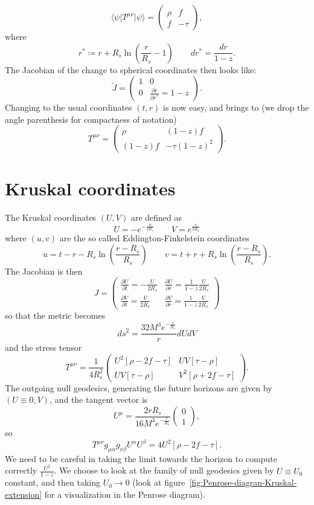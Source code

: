 \[
    \langle\psi\vert T^{\mu\nu}\vert\psi\rangle = 
    \begin{pmatrix}
        \rho & f \\
        f & -\tau
    \end{pmatrix} ,
\]
where
\[
    r^* \coloneqq r + R_s\ln\left(\frac{r}{R_s} - 1\right)    \quad \quad dr^* = \frac{dr}{1 - z}.
\]
The Jacobian of the change to spherical coordinates then looks like:
\[
\tilde{J} = \begin{pmatrix}
    1 & 0 \\
    0 & \frac{\partial r}{\partial r^*} = 1 - z
\end{pmatrix}.   
\]
Changing to the usual coordinates \((t, r)\) is now easy, and brings to (we drop the angle parenthesis for compactness of notation)
\[
   T^{\mu\nu} = \begin{pmatrix}
    \rho & (1 - z)f \\
    (1 - z)f  & -\tau(1 - z)^2
   \end{pmatrix}.
\]

\section{Kruskal coordinates}
The Kruskal coordinates \((U, V)\) are defined as 
\[
   U = - e^{-\frac{u}{2R_s}} \quad \quad V = e^{\frac{v}{2R_s}}
\]
where \((u,v)\) are the so called Eddington-Finkelstein coordinates
\[
u = t - r - R_s\ln\left(\frac{r - R_s}{R_s}\right)    \quad \quad 
v = t + r + R_s\ln\left(\frac{r - R_s}{R_s}\right).
\]
The Jacobian is then
\[
J = \begin{pmatrix}
    \frac{\partial U}{\partial t} = - \frac{U}{2R_s} & \frac{\partial U}{\partial r} = \frac{1}{1 - z} \frac{U}{2R_s} \\
    \frac{\partial V}{\partial t} = \frac{V}{2R_s} & \frac{\partial V}{\partial r} = \frac{1}{1 - z} \frac{V}{2R_s}
\end{pmatrix}    
\]
so that the metric becomes
\[
    ds^2 = \frac{32M^3e^{-\frac{r}{R_s}}}{r}dUdV
\]
and the stress tensor
\[
    T^{\mu\nu} = \frac{1}{4R_s^2}
    \begin{pmatrix}
        U^2 \left[\rho - 2f - \tau \right] &
        UV\left[\tau - \rho\right] \\ 
        UV\left[\tau - \rho\right] &
        V^2 \left[\rho + 2f - \tau \right]
    \end{pmatrix}.
\]
The outgoing null geodesics, generating the future horizons are given by \((U \equiv 0, V)\), and the tangent vector is 
\[
U^{\mu} = \frac{2rR_s}{16M^3e^{-\frac{r}{R_s}}} \begin{pmatrix}
    0 \\ 1
\end{pmatrix},
\]
so
\[
   T^{\mu\nu}g_{\mu\alpha}g_{\nu\beta}U^{\alpha}U^{\beta}  = 
    4U^2\left[\rho - 2f - \tau \right].
\]
We need to be careful in taking the limit towards the horizon to compute correctly \(\frac{U^2}{1 - z}\). We choose to look at the family of null geodesics given by \(U \equiv U_0\) constant, and then taking \(U_0 \rightarrow 0\) (look at figure~\ref{fig:Penrose-diagran-Kruskal-extension} for a visualization in the Penrose diagram). 


